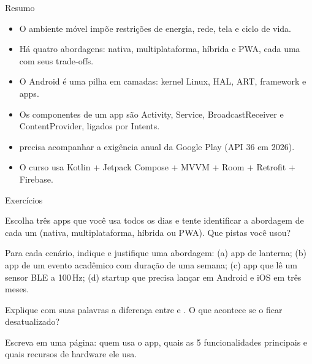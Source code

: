 \documentclass[aspectratio=169,10pt]{beamer}
\begin{document}
\begin{frame}{Resumo}
  \begin{resumo}
    \begin{itemize}
      \item O ambiente móvel impõe restrições de energia, rede, tela e ciclo de vida.
      \item Há quatro abordagens: nativa, multiplataforma, híbrida e PWA, cada uma com seus trade-offs.
      \item O Android é uma pilha em camadas: kernel Linux, HAL, ART, framework e apps.
      \item Os componentes de um app são Activity, Service, BroadcastReceiver e ContentProvider, ligados por Intents.
      \item {} precisa acompanhar a exigência anual da Google Play (API 36 em 2026).
      \item O curso usa Kotlin + Jetpack Compose + MVVM + Room + Retrofit + Firebase.
    \end{itemize}
  \end{resumo}
\end{frame}

\begin{frame}{Exercícios}
  \begin{exercicio}
    Escolha três apps que você usa todos os dias e tente identificar a abordagem de cada um (nativa, multiplataforma, híbrida ou PWA). Que pistas você usou?
  \end{exercicio}
  \begin{exercicio}
    Para cada cenário, indique e justifique uma abordagem: (a) app de lanterna; (b) app de um evento acadêmico com duração de uma semana; (c) app que lê um sensor BLE a 100\,Hz; (d) startup que precisa lançar em Android e iOS em três meses.
  \end{exercicio}
  \begin{exercicio}
    Explique com suas palavras a diferença entre  e . O que acontece se o  ficar desatualizado?
  \end{exercicio}
  \begin{projeto}
    Escreva em uma página: quem usa o app, quais as 5 funcionalidades principais e quais recursos de hardware ele usa.
  \end{projeto}
\end{frame}
\end{document}
